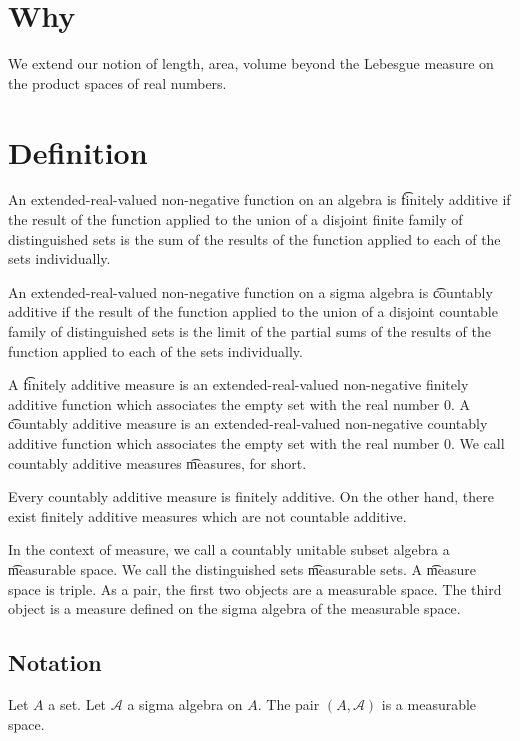 
\section*{Why}

We extend our notion of length, area, volume beyond the Lebesgue measure on the product spaces of real numbers.

\section*{Definition}

An extended-real-valued non-negative function on an algebra is \t{finitely additive} if the result of the function applied to the union of a disjoint finite family of distinguished sets is the sum of the results of the function applied to each of the sets individually.

An extended-real-valued non-negative function on a sigma algebra is \t{countably additive} if the result of the function applied to the union of a disjoint countable family of distinguished sets is the limit of the partial sums of the results of the function applied to each of the sets individually.

A \t{finitely additive measure} is an extended-real-valued non-negative finitely additive function which associates the empty set with the real number $0$.
A \t{countably additive measure} is an extended-real-valued non-negative countably additive function which associates the empty set with the real number $0$.
We call countably additive measures \t{measures}, for short.

Every countably additive measure is finitely additive.
On the other hand, there exist finitely additive measures which are not countable additive.

In the context of measure, we call a countably unitable subset algebra a \t{measurable space}.
We call the distinguished sets \t{measurable} sets.
A \t{measure space} is triple.
As a pair, the first two objects are a measurable space.
The third object is a measure defined on the sigma algebra of the measurable space.

\subsection*{Notation}

Let $A$ a set.
Let $\mathcal{A} $ a sigma algebra on $A$.
The pair $(A, \mathcal{A} )$ is a measurable space.

